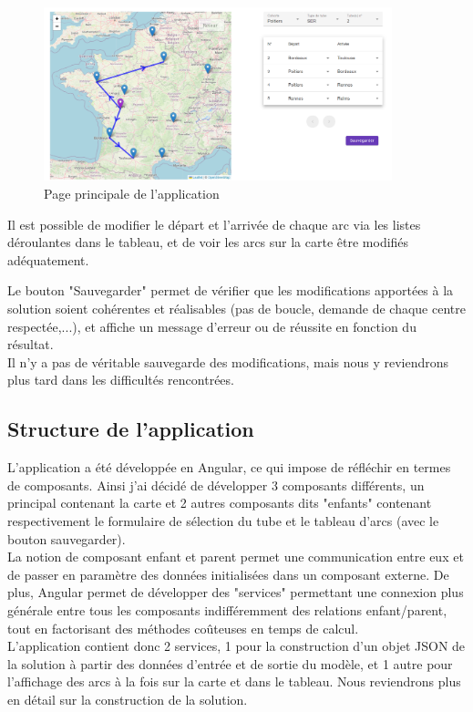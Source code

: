 \documentclass{polytech/polytech}
\numberwithin{figure}{chapter}
\begin{document}
\begin{figure}[h]
    \centering
    \includegraphics[width=0.9\textwidth]{pic/appweb.png}
    \caption{Page principale de l'application}
    \label{appweb}
\end{figure}

Il est possible de modifier le départ et l'arrivée de chaque arc via les listes déroulantes dans le tableau, et de voir les arcs sur la carte être modifiés adéquatement.

Le bouton "Sauvegarder" permet de vérifier que les modifications apportées à la solution soient cohérentes et réalisables (pas de boucle, demande de chaque centre respectée,...), et affiche un message d'erreur ou de réussite en fonction du résultat.\\
Il n'y a pas de véritable sauvegarde des modifications, mais nous y reviendrons plus tard dans les difficultés rencontrées. 

\subsection{Structure de l'application}

L'application a été développée en Angular, ce qui impose de réfléchir en termes de composants. Ainsi j'ai décidé de développer 3 composants différents, un principal contenant la carte et 2 autres composants dits "enfants" contenant respectivement le formulaire de sélection du tube et le tableau d'arcs (avec le bouton sauvegarder).\\

La notion de composant enfant et parent permet une communication entre eux et de passer en paramètre des données initialisées dans un composant externe. De plus, Angular permet de développer des "services" permettant une connexion plus générale entre tous les composants indifféremment des relations enfant/parent, tout en factorisant des méthodes coûteuses en temps de calcul.\\
L'application contient donc 2 services, 1 pour la construction d'un objet JSON de la solution à partir des données d'entrée et de sortie du modèle, et 1 autre pour l'affichage des arcs à la fois sur la carte et dans le tableau. Nous reviendrons plus en détail sur la construction de la solution.\\
\end{document}
